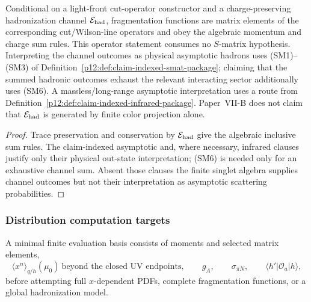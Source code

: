 \documentclass[12pt,a4paper]{article}
\begin{document}
\begin{theorem}
\label{p11:thm:native-fragmentation-hadronization-export}

Conditional on a light-front cut-operator constructor and a charge-preserving
hadronization channel \(\mathcal E_{\rm had}\), fragmentation functions are
matrix elements of the corresponding cut/Wilson-line operators and obey the
algebraic momentum and charge sum rules.  This operator statement consumes no
\(S\)-matrix hypothesis.  Interpreting the channel outcomes as physical
asymptotic hadrons uses \textnormal{(SM1)--(SM3)} of
Definition~\ref{p12:def:claim-indexed-smat-package}; claiming that the summed
hadronic outcomes exhaust the relevant interacting sector additionally uses
\textnormal{(SM6)}.  A massless/long-range asymptotic interpretation uses a
route from Definition~\ref{p12:def:claim-indexed-infrared-package}.  Paper~VII-B
does not claim that \(\mathcal E_{\rm had}\) is generated by finite color
projection alone.
\label{p11:eq:hadronization-charge-sector-decomposition}
\label{p11:eq:fragmentation-momentum-sum-rule}
\end{theorem}
\begin{proof}

Trace preservation and conservation by \(\mathcal E_{\rm had}\) give the
algebraic inclusive sum rules.  The claim-indexed asymptotic and, where
necessary, infrared clauses justify only their physical out-state
interpretation; \textnormal{(SM6)} is needed only for an exhaustive channel
sum.  Absent those clauses the finite singlet algebra supplies channel outcomes
but not their interpretation as asymptotic scattering probabilities.
\end{proof}


\subsubsection{Distribution computation targets}
\label{p11:subsec:distribution-computation-targets}

\begin{definition}
\label{p11:def:distribution-computation-targets}
A minimal finite evaluation basis consists of moments and selected matrix elements,
\begin{equation}
\label{p11:eq:first-distribution-moment-targets}
\langle x^n\rangle_{q/h}(\mu_0)\ \text{beyond the closed UV endpoints},
\qquad
g_A,
\qquad
\sigma_{\pi N},
\qquad
\langle h'|\mathcal O_a|h\rangle,
\end{equation}
before attempting full \(x\)-dependent PDFs, complete fragmentation functions, or a global hadronization model.
\end{definition}
\end{document}
